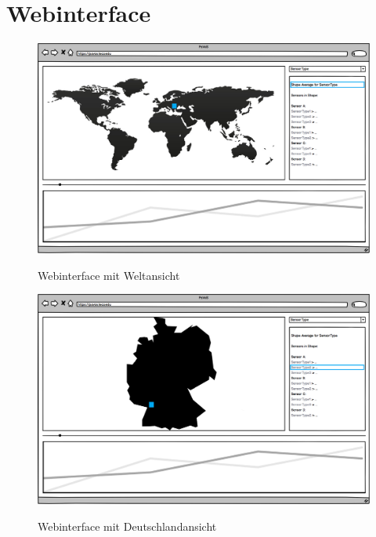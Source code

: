 \section{Webinterface}
\begin{figure}[H]
	\centering
		\includegraphics[width=0.9\linewidth]{gui/frontend/FrontGUI1.png}\\
	\caption{Webinterface mit Weltansicht}
\end{figure}
\begin{figure}[H]
	\centering
		\includegraphics[width=0.9\linewidth]{gui/frontend/FrontGUI2.png}\\
	\caption{Webinterface mit Deutschlandansicht}
\end{figure}